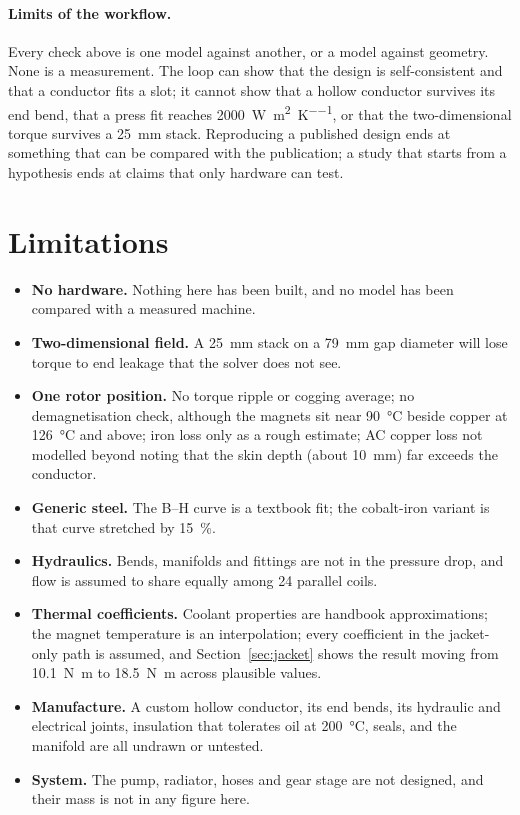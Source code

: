 \documentclass[11pt]{article}
\newcommand{\Nm}{\si{N.m}}
\begin{document}
\paragraph{Limits of the workflow.} Every check above is one model against
another, or a model against geometry. None is a measurement. The loop can show
that the design is self-consistent and that a conductor fits a slot; it cannot
show that a hollow conductor survives its end bend, that a press fit reaches
\SI{2000}{W\per\metre\squared\per\kelvin}, or that the two-dimensional torque
survives a \SI{25}{mm} stack. Reproducing a published design ends at
something that can be compared with the publication; a study that starts from
a hypothesis ends at claims that only hardware can test.

\section{Limitations}
\label{sec:limits}

\begin{itemize}
\item \textbf{No hardware.} Nothing here has been built, and no model has been
  compared with a measured machine.
\item \textbf{Two-dimensional field.} A \SI{25}{mm} stack on a
  \SI{79}{mm} gap diameter will lose torque to end leakage that the solver
  does not see.
\item \textbf{One rotor position.} No torque ripple or cogging average; no
  demagnetisation check, although the magnets sit near \SI{90}{\celsius}
  beside copper at \SI{126}{\celsius} and above; iron loss only as a rough
  estimate; AC copper loss not modelled beyond noting that the skin depth
  (about \SI{10}{mm}) far exceeds the conductor.
\item \textbf{Generic steel.} The B--H curve is a textbook fit; the
  cobalt-iron variant is that curve stretched by \SI{15}{\percent}.
\item \textbf{Hydraulics.} Bends, manifolds and fittings are not in the
  pressure drop, and flow is assumed to share equally among 24 parallel
  coils.
\item \textbf{Thermal coefficients.} Coolant properties are handbook
  approximations; the magnet temperature is an interpolation; every
  coefficient in the jacket-only path is assumed, and Section~\ref{sec:jacket}
  shows the result moving from \SI{10.1}{\Nm} to \SI{18.5}{\Nm} across
  plausible values.
\item \textbf{Manufacture.} A custom hollow conductor, its end bends, its
  hydraulic and electrical joints, insulation that tolerates oil at
  \SI{200}{\celsius}, seals, and the manifold are all undrawn or untested.
\item \textbf{System.} The pump, radiator, hoses and gear stage are not
  designed, and their mass is not in any figure here.
\end{itemize}
\end{document}
